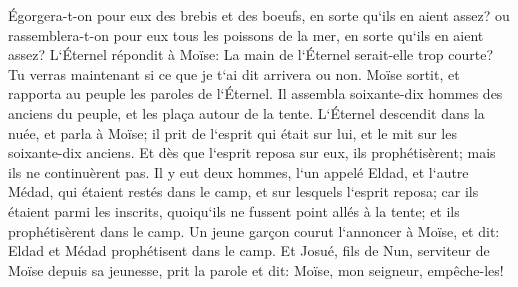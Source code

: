 \verse Égorgera-t-on pour eux des brebis et des boeufs, en sorte qu`ils en aient assez? ou rassemblera-t-on pour eux tous les poissons de la mer, en sorte qu`ils en aient assez? 
\verse L`Éternel répondit à Moïse: La main de l`Éternel serait-elle trop courte? Tu verras maintenant si ce que je t`ai dit arrivera ou non. 
\verse Moïse sortit, et rapporta au peuple les paroles de l`Éternel. Il assembla soixante-dix hommes des anciens du peuple, et les plaça autour de la tente. 
\verse L`Éternel descendit dans la nuée, et parla à Moïse; il prit de l`esprit qui était sur lui, et le mit sur les soixante-dix anciens. Et dès que l`esprit reposa sur eux, ils prophétisèrent; mais ils ne continuèrent pas. 
\verse Il y eut deux hommes, l`un appelé Eldad, et l`autre Médad, qui étaient restés dans le camp, et sur lesquels l`esprit reposa; car ils étaient parmi les inscrits, quoiqu`ils ne fussent point allés à la tente; et ils prophétisèrent dans le camp. 
\verse Un jeune garçon courut l`annoncer à Moïse, et dit: Eldad et Médad prophétisent dans le camp. 
\verse Et Josué, fils de Nun, serviteur de Moïse depuis sa jeunesse, prit la parole et dit: Moïse, mon seigneur, empêche-les! 
